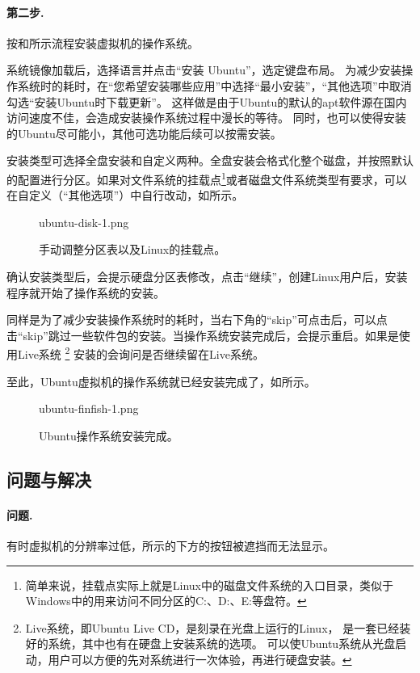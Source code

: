 \documentclass[final]{cvpr}
\newcommand{\mypara}[1]{\paragraph{#1.}}
\begin{document}
\mypara{第二步}  按和所示流程安装虚拟机的操作系统。

系统镜像加载后，选择语言并点击“安装 Ubuntu”，选定键盘布局。
为减少安装操作系统时的耗时，在“您希望安装哪些应用”中选择“最小安装”，“其他选项”中取消勾选“安装Ubuntu时下载更新”。
这样做是由于Ubuntu的默认的apt软件源在国内访问速度不佳，会造成安装操作系统过程中漫长的等待。
同时，也可以使得安装的Ubuntu尽可能小，其他可选功能后续可以按需安装。

安装类型可选择全盘安装和自定义两种。全盘安装会格式化整个磁盘，并按照默认的配置进行分区。如果对文件系统的挂载点\footnote{简单来说，挂载点实际上就是Linux中的磁盘文件系统的入口目录，类似于Windows中的用来访问不同分区的C:、D:、E:等盘符。}或者磁盘文件系统类型有要求，可以在自定义（“其他选项”）中自行改动，如所示。

\begin{figure}
  	\begin{overpic}[width=\columnwidth]{ubuntu-disk-1.png}\end{overpic}
    \caption{手动调整分区表以及Linux的挂载点。}\label{fig:ubuntu-disk}
\end{figure}

确认安装类型后，会提示硬盘分区表修改，点击“继续”，创建Linux用户后，安装程序就开始了操作系统的安装。

同样是为了减少安装操作系统时的耗时，当右下角的“skip”可点击后，可以点击“skip”跳过一些软件包的安装。当操作系统安装完成后，会提示重启。如果是使用Live系统
\footnote{Live系统，即Ubuntu Live CD，是刻录在光盘上运行的Linux，
是一套已经装好的系统，其中也有在硬盘上安装系统的选项。
可以使Ubuntu系统从光盘启动，用户可以方便的先对系统进行一次体验，再进行硬盘安装。 }
安装的会询问是否继续留在Live系统。

至此，Ubuntu虚拟机的操作系统就已经安装完成了，如所示。

\begin{figure}
  	\begin{overpic}[width=\columnwidth]{ubuntu-finfish-1.png}\end{overpic}
    \caption{Ubuntu操作系统安装完成。}\label{fig:ubuntu-finfish}
\end{figure}

\subsection{\textbf{问题与解决}}

\mypara{问题}  有时虚拟机的分辨率过低，所示的下方的按钮被遮挡而无法显示。
\end{document}
